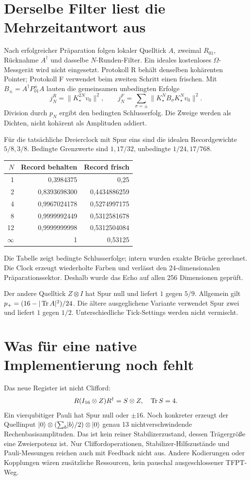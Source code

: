 \section{Derselbe Filter liest die Mehrzeitantwort aus}
Nach erfolgreicher Präparation folgen lokaler Quelltick $A$, zweimal $R_{01}$, Rücknahme $A^\dagger$ und dasselbe $N$-Runden-Filter. Ein ideales kostenloses $\Omega$-Messgerät wird nicht eingesetzt. Protokoll R behält denselben kohärenten Pointer; Protokoll F verwendet beim zweiten Schritt einen frischen. Mit $B_\pm=A^\dagger P^\pm_{01}A$ lauten die gemeinsamen unbedingten Erfolge
\begin{equation}
j_N^R=\|K_\star^{2N}v_0\|^2,\qquad
j_N^F=\sum_{\sigma=\pm}\|K_\star^NB_\sigma K_\star^Nv_0\|^2.
\end{equation}
Division durch $p_N$ ergibt den bedingten Schlusserfolg. Die Zweige werden als Dichten, nicht kohärent als Amplituden addiert.

Für die tatsächliche Dreierclock mit Spur eins sind die idealen Recordgewichte $5/8,3/8$. Bedingte Grenzwerte sind $1,17/32$, unbedingte $1/24,17/768$.
\begin{center}\begin{tabular}{rrr}
\toprule $N$&Record behalten&Record frisch\\\midrule
1&0,3984375&0,25\\
2&0,8393698300&0,4434886259\\
4&0,9967024178&0,5274997175\\
8&0,9999992449&0,5312581678\\
12&0,9999999998&0,5312504084\\
$\infty$&1&0,53125\\\bottomrule
\end{tabular}\end{center}
Die Tabelle zeigt bedingte Schlusserfolge; intern wurden exakte Brüche gerechnet. Die Clock erzeugt wiederholte Farben und verlässt den 24-dimensionalen Präparationssektor. Deshalb wurde das Echo auf allen 256 Dimensionen geprüft.

Der andere Quelltick $Z\otimes I$ hat Spur null und liefert $1$ gegen $5/9$. Allgemein gilt $p_+=(16-|\operatorname{Tr} A|^2)/24$. Die ältere ausgeglichene Variante verwendet Spur zwei und liefert $1$ gegen $1/2$. Unterschiedliche Tick-Settings werden nicht vermischt.

\section{Was für eine native Implementierung noch fehlt}
Das neue Register ist nicht Clifford:
\begin{equation}
R(I_{16}\otimes Z)R^\dagger=S\otimes Z,\quad \operatorname{Tr} S=4.
\end{equation}
Ein vierqubitiger Pauli hat Spur null oder $\pm16$. Noch konkreter erzeugt der Quellinput $\lvert0\rangle\otimes(\sum_b\lvert b\rangle/2)\otimes\lvert0\rangle$ genau 13 nichtverschwindende Rechenbasisamplituden. Das ist kein reiner Stabilizerzustand, dessen Trägergröße eine Zweierpotenz ist. Nur Cliffordoperationen, Stabilizer-Hilfszustände und Pauli-Messungen reichen auch mit Feedback nicht aus. Andere Kodierungen oder Kopplungen wären zusätzliche Ressourcen, kein pauschal ausgeschlossener TFPT-Weg.

